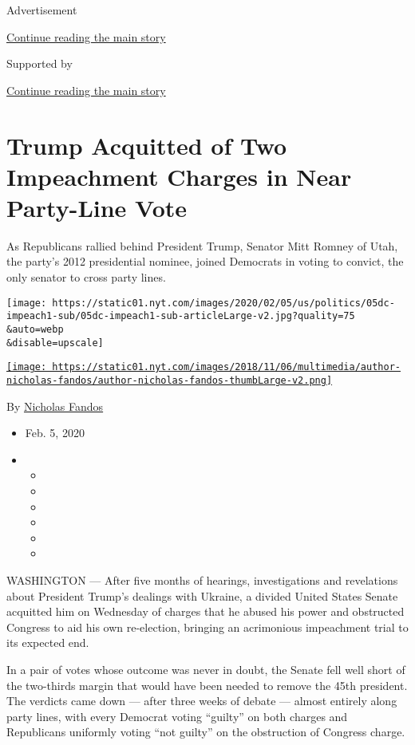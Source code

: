 Advertisement

\protect\hyperlink{after-top}{Continue reading the main story}

Supported by

\protect\hyperlink{after-sponsor}{Continue reading the main story}

\hypertarget{trump-acquitted-of-two-impeachment-charges-in-near-party-line-vote}{%
\section{Trump Acquitted of Two Impeachment Charges in Near Party-Line
Vote}\label{trump-acquitted-of-two-impeachment-charges-in-near-party-line-vote}}

As Republicans rallied behind President Trump, Senator Mitt Romney of
Utah, the party's 2012 presidential nominee, joined Democrats in voting
to convict, the only senator to cross party lines.

\texttt{[image: https://static01.nyt.com/images/2020/02/05/us/politics/05dc-impeach1-sub/05dc-impeach1-sub-articleLarge-v2.jpg?quality=75\\\&auto=webp\\\&disable=upscale]}

\href{https://www.nytimes.com/by/nicholas-fandos}{\texttt{[image: https://static01.nyt.com/images/2018/11/06/multimedia/author-nicholas-fandos/author-nicholas-fandos-thumbLarge-v2.png]}}

By \href{https://www.nytimes.com/by/nicholas-fandos}{Nicholas Fandos}

\begin{itemize}
\item
  Feb. 5, 2020
\item
  \begin{itemize}
  \item
  \item
  \item
  \item
  \item
  \item
  \end{itemize}
\end{itemize}

WASHINGTON --- After five months of hearings, investigations and
revelations about President Trump's dealings with Ukraine, a divided
United States Senate acquitted him on Wednesday of charges that he
abused his power and obstructed Congress to aid his own re-election,
bringing an acrimonious impeachment trial to its expected end.

In a pair of votes whose outcome was never in doubt, the Senate fell
well short of the two-thirds margin that would have been needed to
remove the 45th president. The verdicts came down --- after three weeks
of debate --- almost entirely along party lines, with every Democrat
voting ``guilty'' on both charges and Republicans uniformly voting ``not
guilty'' on the obstruction of Congress charge.

